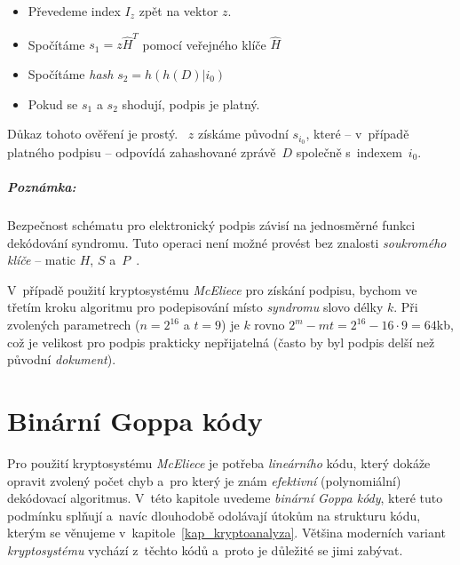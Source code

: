 \documentclass[thesis=M,czech,hidelinks]{FITthesis}[2012/06/26]
\newcommand{\0}{{\textcolor[gray]{0.75}{0}}}
\begin{document}
\begin{itemize}
    \item Převedeme index $I_z$ zpět na vektor $z$.
    \item Spočítáme $s_1 = z\hat{H}^T$ pomocí veřejného klíče $\hat{H}$
    \item Spočítáme \emph{hash} $s_2 = h(h(D)|i_0)$
    \item Pokud se $s_1$ a $s_2$ shodují, podpis je platný.
\end{itemize}

Důkaz tohoto ověření je prostý. ~$z$ získáme původní $s_{i_0}$,
které -- v~případě platného podpisu -- odpovídá zahashované zprávě~$D$
spo\-lečně s~indexem~$i_0$.


\paragraph{Poznámka:} Bezpečnost schématu pro elektronický podpis závisí na
jednosměrné funkci dekódování syndromu. Tuto operaci není možné provést bez
znalosti \emph{soukromého klíče} -- matic $H$, $S$
a~$P$~\cite{Niederreiter,XingLi}.

V~případě použití kryptosystému \emph{McEliece} pro získání podpisu, bychom ve
třetím kroku algoritmu pro podepisování místo \emph{syndromu} slovo délky $k$.
Při zvolených parametrech ($n=2^{16}$ a $t=9$) je $k$ rovno $2^m - m t = 2^{16}
- 16 \cdot 9 = 64$\;kb, což je velikost pro podpis prakticky nepřijatelná (často
by byl podpis delší než původní \emph{dokument}).





\chapter{Binární Goppa kódy}\label{kap_goppa_kody}

Pro použití kryptosystému \emph{McEliece} je potřeba \emph{lineárního} kódu,
který dokáže opravit zvolený počet chyb a~pro který je znám \emph{efektivní}
(polynomiální) dekódovací algoritmus. V~této kapitole uvedeme \emph{binární
Goppa kódy}, které tuto podmínku splňují a~navíc dlouhodobě odolávají
útokům na strukturu kódu, kterým se věnujeme v~kapitole~\ref{kap_kryptoanalyza}.
Většina moderních variant \emph{kryptosystému} vychází z~těchto kódů a~proto je
důležité se jimi zabývat.
\end{document}
